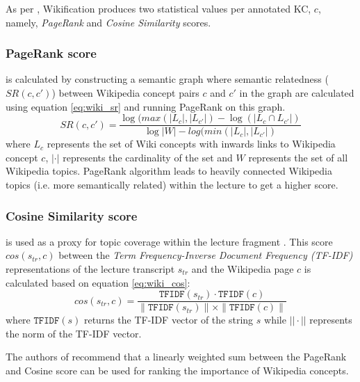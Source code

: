 \documentclass[letterpaper]{article} %
\begin{document}
As per \cite{wikifier}, Wikification produces two statistical values per annotated KC, $c$, namely, \emph{PageRank} and \emph{Cosine Similarity} scores.

\subsubsection{PageRank score}

is calculated by constructing a semantic graph where semantic relatedness ($SR(c,c')$) between Wikipedia concept pairs $c$ and $c'$ in the graph are calculated using equation \ref{eq:wiki_sr} and running PageRank on this graph.
\begin{equation}\label{eq:wiki_sr}
        SR(c,c') = \frac{\log(max(|L_c|, |L_{c'}|) - \log(|L_c \cap L_{c'}|)}
        {\log |W| - log (min(|L_c|, |L_{c'}|)}
\end{equation}
where $L_{c}$ represents the set of Wiki concepts with inwards links to Wikipedia concept $c$, $|\cdot|$ represents the cardinality of the set and $W$ represents the set of all Wikipedia topics.
PageRank algorithm\cite{pagerank} leads to heavily connected Wikipedia topics (i.e. more semantically related) within the lecture to get a higher score.

\subsubsection{Cosine Similarity score}
is used as a proxy for topic coverage within the lecture fragment \cite{truelearn}. This score $cos(s_{tr}, c)$ between the \emph{Term Frequency-Inverse Document Frequency (TF-IDF)} representations of the lecture transcript $s_{tr}$ and the Wikipedia page $c$ is calculated based on equation \ref{eq:wiki_cos}:
\begin{equation}\label{eq:wiki_cos}
        cos(s_{tr}, c) = \frac{\texttt{TFIDF}(s_{tr}) \cdot \texttt{TFIDF}(c)}
        {\|\texttt{TFIDF}(s_{tr})\| \times \|\texttt{TFIDF}(c)\|}
\end{equation}
where $\texttt{TFIDF}(s)$ returns the TF-IDF vector of the string $s$ while $||\cdot||$ represents the norm of the TF-IDF vector.

The authors of \cite{wikifier} recommend that a linearly weighted sum between the PageRank and Cosine score can be used for ranking the importance of Wikipedia concepts.

\end{document}
